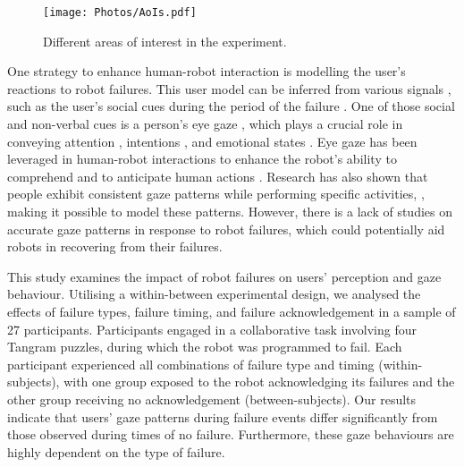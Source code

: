 \begin{figure}[t]
  \centering
  \texttt{[image: Photos/AoIs.pdf]} 
  \caption{Different areas of interest in the experiment.
}
  \label{fig:Robot}
\end{figure}



One strategy to enhance human-robot interaction is modelling the user's reactions to robot failures. This user model can be inferred from various signals \cite{ rossi_user_2017}, such as the user’s social cues during the period of the failure \cite{rabinowitz_machine_2018}. One of those social and non-verbal cues is a person’s eye gaze \cite{wachowiak_analysing_2022}, which plays a crucial role in conveying attention \cite{velichkovsky_social_2021, fang_dual_2021}, intentions \cite{velichkovsky_social_2021, fang_dual_2021, rubies_enhancing_2022}, and emotional states \cite{velichkovsky_social_2021, huang_using_2015}. Eye gaze has been leveraged in human-robot interactions to enhance the robot's ability to comprehend and to anticipate human actions \cite{fang_dual_2021, mwangi_dyadic_2018}. Research has also shown that people exhibit consistent gaze patterns while performing specific activities, \cite{johansson_eye-hand_2001, land_what_2001, matthis_gaze_2018}, making it possible to model these patterns. However, there is a lack of studies on accurate gaze patterns in response to robot failures, which could potentially aid robots in recovering from their failures.

  

This study examines the impact of robot failures on users' perception and gaze behaviour. Utilising a within-between experimental design, we analysed the effects of failure types, failure timing, and failure acknowledgement in a sample of 27 participants. Participants engaged in a collaborative task involving four Tangram puzzles, during which the robot was programmed to fail. Each participant experienced all combinations of failure type and timing (within-subjects), with one group exposed to the robot acknowledging its failures and the other group receiving no acknowledgement (between-subjects). Our results indicate that users' gaze patterns during failure events differ significantly from those observed during times of no failure. Furthermore, these gaze behaviours are highly dependent on the type of failure.






